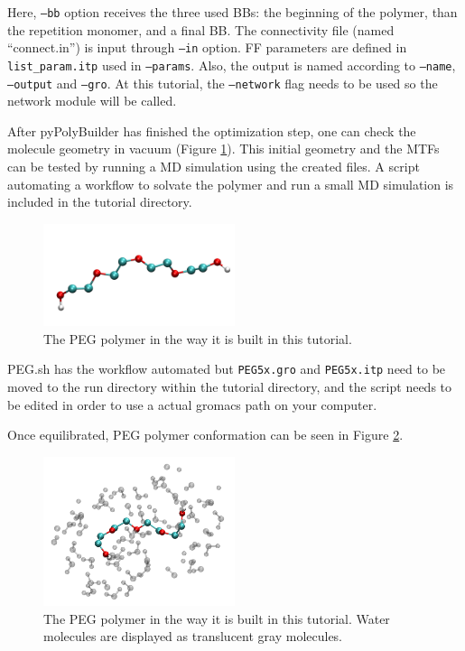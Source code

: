 Here, \texttt{--bb} option receives the three used BBs: the beginning of the polymer, than the repetition monomer, and a final BB.
The connectivity file (named ``connect.in'') is input through \texttt{--in} option.
FF parameters are defined in \texttt{list\_param.itp} used in \texttt{--params}.
Also, the output is named according to \texttt{--name}, \texttt{--output} and \texttt{--gro}.
At this tutorial, the \texttt{--network} flag needs to be used so the network module will be called.

After pyPolyBuilder has finished the optimization step, one can check the molecule geometry in vacuum (Figure \ref{fig:PEGPPB}). 
This initial geometry and the MTFs can be tested by running a MD simulation using the created files.
A script automating a workflow to solvate the polymer and  run a small MD simulation is included in the tutorial directory.

\begin{figure}
    \center
    \includegraphics[width=0.5\textwidth]{PEG/PEGPPB.png}
    \caption{The PEG polymer in the way it is built in this tutorial.}
    \label{fig:PEGPPB}
\end{figure}

PEG.sh has the workflow automated but \texttt{PEG5x.gro} and \texttt{PEG5x.itp} need to be moved to the run directory within the tutorial directory, and the script needs to be edited in order to use a actual gromacs path on your computer.

Once equilibrated, PEG polymer conformation can be seen in Figure \ref{fig:PEGSOL}.

\begin{figure}
    \center
    \includegraphics[width=0.5\textwidth]{PEG/PEGSOL.png}
    \caption{The PEG polymer in the way it is built in this tutorial. Water molecules are displayed as translucent gray molecules.}
    \label{fig:PEGSOL}
\end{figure}